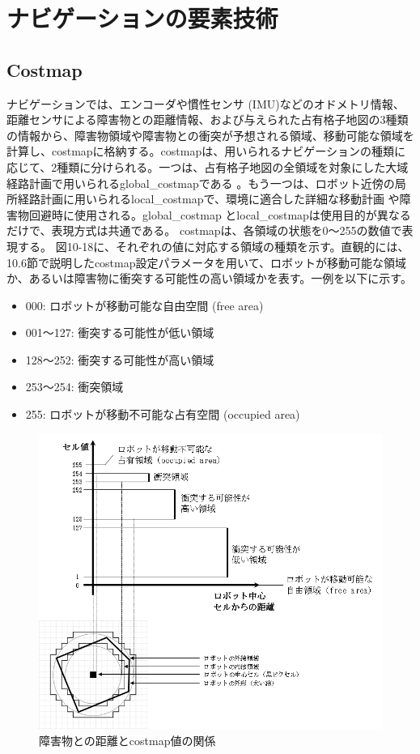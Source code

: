 \section{ナビゲーションの要素技術}

\subsection{Costmap}

ナビゲーションでは、エンコーダや慣性センサ (IMU)などのオドメトリ情報、距離センサによる障害物との距離情報、および与えられた占有格子地図の3種類の情報から、障害物領域や障害物との衝突が予想される領域、移動可能な領域を計算し、costmapに格納する。costmapは、用いられるナビゲーションの種類に応じて、2種類に分けられる。一つは、占有格子地図の全領域を対象にした大域経路計画で用いられるglobal\_costmapである  。もう一つは、ロボット近傍の局所経路計画に用いられるlocal\_costmapで、環境に適合した詳細な移動計画  や障害物回避時に使用される。global\_costmap とlocal\_costmapは使用目的が異なるだけで、表現方式は共通である。
costmapは、各領域の状態を0〜255の数値で表現する。  図10-18に、それぞれの値に対応する領域の種類を示す。直観的には、10.6節で説明したcostmap設定パラメータを用いて、ロボットが移動可能な領域か、あるいは障害物に衝突する可能性の高い領域かを表す。一例を以下に示す。

\begin{itemize}
\item 000: ロボットが移動可能な自由空間 (free area)
\item 001〜127: 衝突する可能性が低い領域
\item 128〜252: 衝突する可能性が高い領域
\item 253〜254: 衝突領域
\item 255: ロボットが移動不可能な占有空間 (occupied area)
\end{itemize}

\begin{figure}[htp]
  \centering
  \includegraphics[width=12cm]{pictures/chapter10/pic_10_18.png}
  \caption{障害物との距離とcostmap値の関係}
\end{figure}

